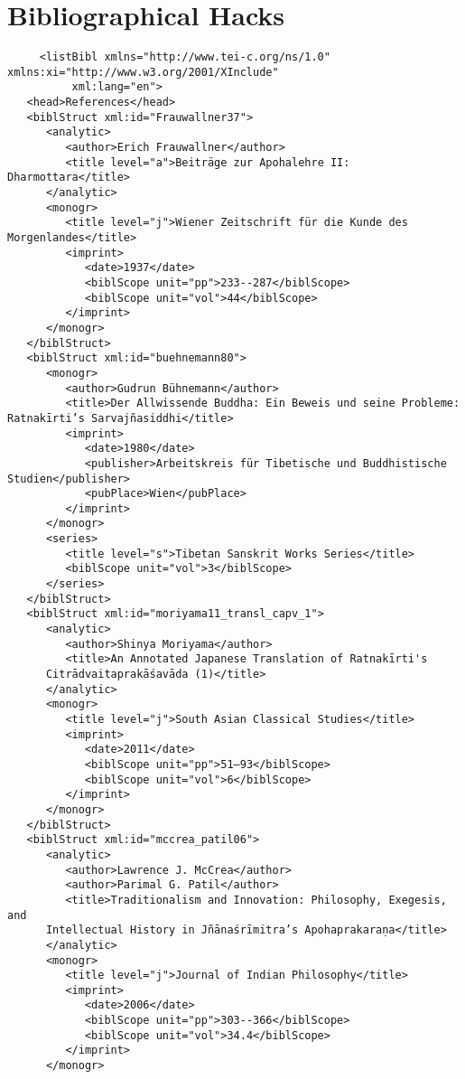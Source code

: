 \documentclass[article,12pt,a4paper]{memoir}
\begin{document}
       \chapter{Bibliographical Hacks}
       \begin{verbatim}
     <listBibl xmlns="http://www.tei-c.org/ns/1.0" xmlns:xi="http://www.w3.org/2001/XInclude"
          xml:lang="en">
   <head>References</head>
   <biblStruct xml:id="Frauwallner37">
      <analytic>
         <author>Erich Frauwallner</author>
         <title level="a">Beiträge zur Apohalehre II: Dharmottara</title>
      </analytic>
      <monogr>
         <title level="j">Wiener Zeitschrift für die Kunde des Morgenlandes</title>
         <imprint>
            <date>1937</date>
            <biblScope unit="pp">233--287</biblScope>
            <biblScope unit="vol">44</biblScope>
         </imprint>
      </monogr>
   </biblStruct>
   <biblStruct xml:id="buehnemann80">
      <monogr>
         <author>Gudrun Bühnemann</author>
         <title>Der Allwissende Buddha: Ein Beweis und seine Probleme: Ratnakīrti’s Sarvajñasiddhi</title>
         <imprint>
            <date>1980</date>
            <publisher>Arbeitskreis für Tibetische und Buddhistische Studien</publisher>
            <pubPlace>Wien</pubPlace>
         </imprint>
      </monogr>
      <series>
         <title level="s">Tibetan Sanskrit Works Series</title>
         <biblScope unit="vol">3</biblScope>
      </series>
   </biblStruct>
   <biblStruct xml:id="moriyama11_transl_capv_1">
      <analytic>
         <author>Shinya Moriyama</author>
         <title>An Annotated Japanese Translation of Ratnakīrti's
      Citrādvaitaprakāśavāda (1)</title>
      </analytic>
      <monogr>
         <title level="j">South Asian Classical Studies</title>
         <imprint>
            <date>2011</date>
            <biblScope unit="pp">51–93</biblScope>
            <biblScope unit="vol">6</biblScope>
         </imprint>
      </monogr>
   </biblStruct>
   <biblStruct xml:id="mccrea_patil06">
      <analytic>
         <author>Lawrence J. McCrea</author>
         <author>Parimal G. Patil</author>
         <title>Traditionalism and Innovation: Philosophy, Exegesis, and
      Intellectual History in Jñānaśrīmitra’s Apohaprakaraṇa</title>
      </analytic>
      <monogr>
         <title level="j">Journal of Indian Philosophy</title>
         <imprint>
            <date>2006</date>
            <biblScope unit="pp">303--366</biblScope>
            <biblScope unit="vol">34.4</biblScope>
         </imprint>
      </monogr>

\end{verbatim}
\end{document}
